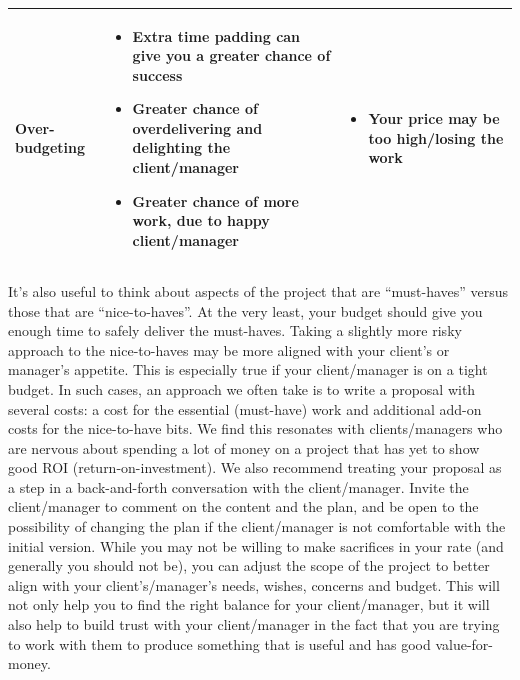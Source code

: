 \documentclass[
]{book}
\providecommand{\tightlist}{%
  \setlength{\itemsep}{0pt}\setlength{\parskip}{0pt}}
\begin{document}
\begin{longtable}[]{@{}lll@{}}
\begin{minipage}[t]{0.23\columnwidth}
Over-budgeting\strut
\end{minipage} & \begin{minipage}[t]{0.29\columnwidth}\raggedright
\begin{itemize}
\tightlist
\item
  Extra time padding
  can give you a
  greater chance of
  success
\item
  Greater chance of
  overdelivering and
  delighting the
  client/manager
\item
  Greater chance of
  more work, due to
  happy client/manager
\end{itemize}\strut
\end{minipage} & \begin{minipage}[t]{0.29\columnwidth}\raggedright
\begin{itemize}
\tightlist
\item
  Your price may be
  too high/losing the
  work
\end{itemize}\strut
\end{minipage}\tabularnewline
\bottomrule
\end{longtable}

It's also useful to think about aspects of the project that are ``must-haves'' versus those that are ``nice-to-haves''. At the very least, your budget should give you enough time to safely deliver the must-haves. Taking a slightly more risky approach to the nice-to-haves may be more aligned with your client's or manager's appetite. This is especially true if your client/manager is on a tight budget. In such cases, an approach we often take is to write a proposal with several costs: a cost for the essential (must-have) work and additional add-on costs for the nice-to-have bits. We find this resonates with clients/managers who are nervous about spending a lot of money on a project that has yet to show good ROI (return-on-investment). We also recommend treating your proposal as a step in a back-and-forth conversation with the client/manager. Invite the client/manager to comment on the content and the plan, and be open to the possibility of changing the plan if the client/manager is not comfortable with the initial version. While you may not be willing to make sacrifices in your rate (and generally you should not be), you can adjust the scope of the project to better align with your client's/manager's needs, wishes, concerns and budget. This will not only help you to find the right balance for your client/manager, but it will also help to build trust with your client/manager in the fact that you are trying to work with them to produce something that is useful and has good value-for-money.
\end{document}
